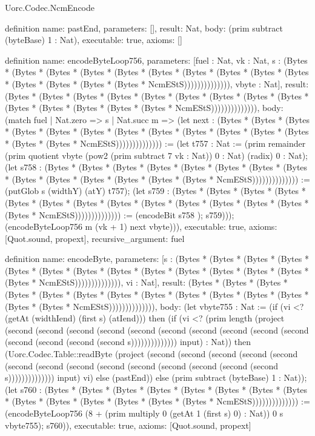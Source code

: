 \begin{lexlean}{Uorc.Codec.NcmEncode}
\begin{semanticmodule}
definition{
  name: pastEnd,
  parameters: [],
  result: Nat,
  body: (prim subtract (byteBase) 1 : Nat),
  executable: true,
  axioms: []
}

definition{
  name: encodeByteLoop756,
  parameters: [fuel : Nat, vk : Nat, s : (Bytes * (Bytes * (Bytes * (Bytes * (Bytes * (Bytes * (Bytes * (Bytes * (Bytes * (Bytes * (Bytes * (Bytes * (Bytes * (Bytes * NcmEStS)))))))))))))), vbyte : Nat],
  result: (Bytes * (Bytes * (Bytes * (Bytes * (Bytes * (Bytes * (Bytes * (Bytes * (Bytes * (Bytes * (Bytes * (Bytes * (Bytes * (Bytes * NcmEStS)))))))))))))),
  body: (match fuel
    | Nat.zero => s
    | Nat.succ m => (let next : (Bytes * (Bytes * (Bytes * (Bytes * (Bytes * (Bytes * (Bytes * (Bytes * (Bytes * (Bytes * (Bytes * (Bytes * (Bytes * (Bytes * NcmEStS)))))))))))))) := (let t757 : Nat := (prim remainder (prim quotient vbyte (pow2 (prim subtract 7 vk : Nat)) 0 : Nat) (radix) 0 : Nat); (let s758 : (Bytes * (Bytes * (Bytes * (Bytes * (Bytes * (Bytes * (Bytes * (Bytes * (Bytes * (Bytes * (Bytes * (Bytes * (Bytes * (Bytes * NcmEStS)))))))))))))) := (putGlob s (widthY) (atY) t757); (let s759 : (Bytes * (Bytes * (Bytes * (Bytes * (Bytes * (Bytes * (Bytes * (Bytes * (Bytes * (Bytes * (Bytes * (Bytes * (Bytes * (Bytes * NcmEStS)))))))))))))) := (encodeBit s758 ); s759))); (encodeByteLoop756 m (vk + 1) next vbyte))),
  executable: true,
  axioms: [Quot.sound, propext],
  recursive_argument: fuel
}

definition{
  name: encodeByte,
  parameters: [s : (Bytes * (Bytes * (Bytes * (Bytes * (Bytes * (Bytes * (Bytes * (Bytes * (Bytes * (Bytes * (Bytes * (Bytes * (Bytes * (Bytes * NcmEStS)))))))))))))), vi : Nat],
  result: (Bytes * (Bytes * (Bytes * (Bytes * (Bytes * (Bytes * (Bytes * (Bytes * (Bytes * (Bytes * (Bytes * (Bytes * (Bytes * (Bytes * NcmEStS)))))))))))))),
  body: (let vbyte755 : Nat := (if (vi <? (getAt (widthIend) (first s) (atIend))) then (if (vi <? (prim length (project (second (second (second (second (second (second (second (second (second (second (second (second (second (second s)))))))))))))) input) : Nat)) then (Uorc.Codec.Table::readByte (project (second (second (second (second (second (second (second (second (second (second (second (second (second (second s)))))))))))))) input) vi) else (pastEnd)) else (prim subtract (byteBase) 1 : Nat)); (let s760 : (Bytes * (Bytes * (Bytes * (Bytes * (Bytes * (Bytes * (Bytes * (Bytes * (Bytes * (Bytes * (Bytes * (Bytes * (Bytes * (Bytes * NcmEStS)))))))))))))) := (encodeByteLoop756 (8 + (prim multiply 0 (getAt 1 (first s) 0) : Nat)) 0 s vbyte755); s760)),
  executable: true,
  axioms: [Quot.sound, propext]
}


\end{semanticmodule}
\end{lexlean}
